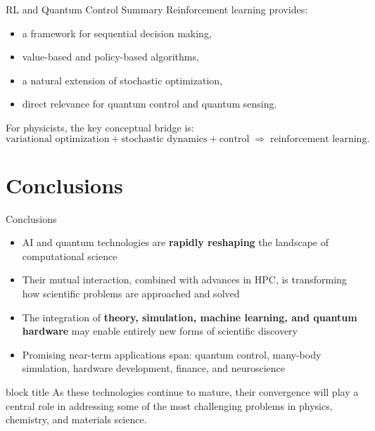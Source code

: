 \documentclass[aspectratio=169]{beamer}
\begin{document}
\begin{frame}{RL and Quantum Control Summary}
  Reinforcement learning provides:
  \begin{itemize}
  \item a framework for sequential decision making,
  \item value-based and policy-based algorithms,
  \item a natural extension of stochastic optimization,
  \item direct relevance for quantum control and quantum sensing.
  \end{itemize}

  For physicists, the key conceptual bridge is:
  \[
  \text{variational optimization} + \text{stochastic dynamics} + \text{control}
  \;\Rightarrow\; \text{reinforcement learning}.
  \]
\end{frame}



\section{Conclusions}

\begin{frame}{Conclusions}

  \begin{itemize}
    \setlength\itemsep{8pt}
    \item AI and quantum technologies are \textbf{rapidly reshaping}
          the landscape of computational science
    \medskip
    \item Their mutual interaction, combined with advances in HPC,
          is transforming how scientific problems are approached and solved
    \medskip
    \item The integration of \textbf{theory, simulation, machine learning,
          and quantum hardware} may enable entirely new forms of
          scientific discovery
    \medskip
    \item Promising near-term applications span:
          quantum control, many-body simulation, hardware development,
          finance, and neuroscience
  \end{itemize}

  \bigskip
  \begin{center}
    \begin{beamercolorbox}[rounded=true,sep=6pt,center,wd=0.88\linewidth]{block title}
      As these technologies continue to mature, their convergence
      will play a central role in addressing some of the most
      challenging problems in physics, chemistry, and materials science.
    \end{beamercolorbox}
  \end{center}

\end{frame}
\end{document}
